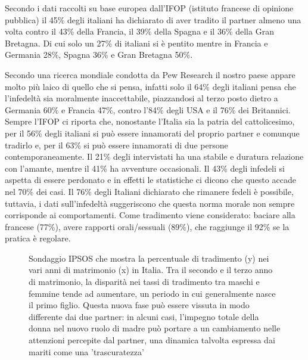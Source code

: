 \documentclass[12pt]{book} %
\begin{document}
Secondo i dati raccolti su base europea dall'IFOP (istituto francese di opinione pubblica) il 45\% degli italiani ha dichiarato di
aver tradito il partner almeno una volta contro il 43\% della Francia, il 39\% della Spagna e il 36\% della Gran
Bretagna. Di cui solo un 27\% di italiani si è pentito mentre in Francia e Germania 28\%, Spagna 36\% e Gran Bretagna 50\%. 

Secondo una ricerca mondiale condotta da Pew
Research il nostro paese appare molto più laico di quello che si pensa, infatti solo il 64\% degli italiani pensa che
l'infedeltà sia moralmente inaccettabile, piazzandosi al terzo posto dietro a Germania 60\% e
Francia 47\%, contro l'84\% degli USA e il 76\% dei Britannici. Sempre l'IFOP
ci riporta che, nonostante l'Italia sia la patria del cattolicesimo, per il 56\% degli italiani si
può essere innamorati del proprio partner e comunque tradirlo e, per il 63\% si può essere innamorati di due persone
contemporaneamente. Il 21\% degli intervistati ha una stabile e duratura relazione con l'amante,
mentre il 41\% ha avventure occasionali. Il 43\% degli infedeli si aspetta di essere perdonato e in effetti le
statistiche ci dicono che questo accade nel 70\% dei casi. Il 76\% degli Italiani dichiarato che rimanere fedeli è
possibile, tuttavia, i dati sull’infedeltà suggeriscono che questa norma morale non sempre corrisponde ai comportamenti. Come tradimento viene considerato: baciare alla francese (77\%), avere rapporti orali/sessuali (89\%), che raggiunge il 92\% se la pratica è regolare. 

\needspace{4cm}
\begin{figure}[H]
  \centering
  \caption{Sondaggio IPSOS che mostra la percentuale di tradimento (y) nei vari anni di matrimonio (x) in Italia. Tra il secondo e il terzo anno di matrimonio, la disparità nei tassi di tradimento tra maschi e femmine tende ad aumentare, un periodo in cui generalmente nasce il primo figlio. Questa nuova fase può essere vissuta in modo differente dai due partner: in alcuni casi, l'impegno totale della donna nel nuovo ruolo di madre può portare a un cambiamento nelle attenzioni percepite dal partner, una dinamica talvolta espressa dai mariti come una 'trascuratezza'}
\end{figure}
\end{document}
